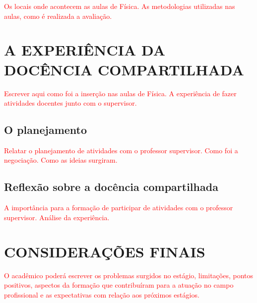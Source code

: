 \documentclass[12pt,a4paper]{article}
\begin{document}
        \textcolor{red}{Os locais onde acontecem as aulas de Física. As metodologias utilizadas nas aulas, como é realizada a avaliação.}


\newpage

\section{A EXPERIÊNCIA DA DOCÊNCIA COMPARTILHADA}

        \textcolor{red}{Escrever aqui como foi a inserção nas aulas de Física. A experiência de fazer atividades docentes junto com o supervisor.}

    \subsection{O planejamento}

        \textcolor{red}{Relatar o planejamento de atividades com o professor supervisor. Como foi a negociação. Como as ideias surgiram.}

    \subsection{Reflexão sobre a docência compartilhada}

        \textcolor{red}{A importância para a formação de participar de atividades com o professor supervisor. Análise da experiência.}


\newpage

\section{CONSIDERAÇÕES FINAIS}

        \textcolor{red}{O acadêmico poderá escrever os problemas surgidos no estágio, limitações, pontos positivos, aspectos da formação que contribuíram para a atuação no campo profissional e as expectativas com relação aos próximos estágios.}

\newpage

\nocite{BNCC}

\end{document}
